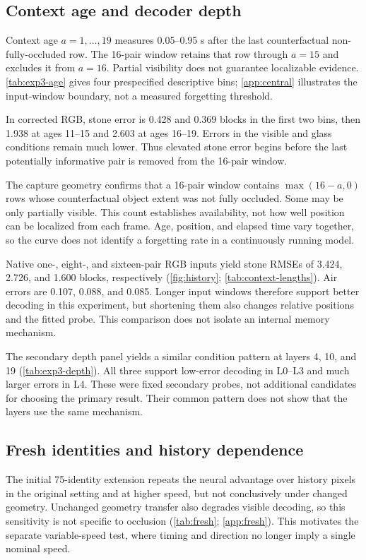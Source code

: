 \documentclass{article}
\begin{document}
\subsection{Context age and decoder depth}
\label{sec:age}
Context age $a=1,\ldots,19$ measures 0.05--0.95 s after the last counterfactual non-fully-occluded row. The 16-pair window retains that row through $a=15$ and excludes it from $a=16$. Partial visibility does not guarantee localizable evidence. \autoref{tab:exp3-age} gives four prespecified descriptive bins; \autoref{app:central} illustrates the input-window boundary, not a measured forgetting threshold.

In corrected RGB, stone error is 0.428 and 0.369 blocks in the first two bins, then 1.938 at ages 11--15 and 2.603 at ages 16--19. Errors in the visible and glass conditions remain much lower. Thus elevated stone error begins before the last potentially informative pair is removed from the 16-pair window.


The capture geometry confirms that a 16-pair window contains $\max(16-a,0)$ rows whose counterfactual object extent was not fully occluded. Some may be only partially visible. This count establishes availability, not how well position can be localized from each frame. Age, position, and elapsed time vary together, so the curve does not identify a forgetting rate in a continuously running model.

Native one-, eight-, and sixteen-pair RGB inputs yield stone RMSEs of 3.424, 2.726, and 1.600 blocks, respectively (\autoref{fig:history}; \autoref{tab:context-lengths}). Air errors are 0.107, 0.088, and 0.085. Longer input windows therefore support better decoding in this experiment, but shortening them also changes relative positions and the fitted probe. This comparison does not isolate an internal memory mechanism.



The secondary depth panel yields a similar condition pattern at layers 4, 10, and 19 (\autoref{tab:exp3-depth}). All three support low-error decoding in L0--L3 and much larger errors in L4. These were fixed secondary probes, not additional candidates for choosing the primary result. Their common pattern does not show that the layers use the same mechanism.



\subsection{Fresh identities and history dependence}
\label{sec:fresh-results}
The initial 75-identity extension repeats the neural advantage over history pixels in the original setting and at higher speed, but not conclusively under changed geometry. Unchanged geometry transfer also degrades visible decoding, so this sensitivity is not specific to occlusion (\autoref{tab:fresh}; \autoref{app:fresh}). This motivates the separate variable-speed test, where timing and direction no longer imply a single nominal speed.
\end{document}
